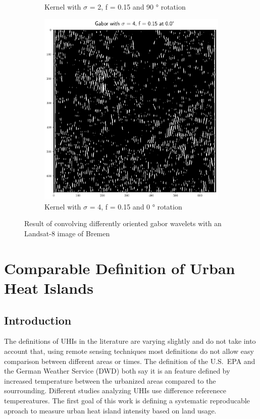 \documentclass[a4paper, english]{article}
\begin{document}
\begin{figure}[!htbp]
\begin{subfigure}[b]{0.3\textwidth}
         \caption{Kernel with $\sigma$ = 2, f = 0.15 and 90 ° rotation}\label{fig:feat05}
     \end{subfigure}
     \hfill
     \begin{subfigure}[b]{0.3\textwidth}
         \centering
         \includegraphics[width=\textwidth]{img/Features_4_015_0.png}
         \caption{Kernel with $\sigma$ = 4, f = 0.15 and 0 ° rotation}\label{fig:feat06}
     \end{subfigure}
        \caption{Result of convolving differently oriented gabor wavelets with an Landsat-8 image of Bremen}\label{fig:gaborExample}
    \end{figure}




    \section{Comparable Definition of Urban Heat Islands}\label{sec:definition}
    \subsection{Introduction}
    The definitions of \glspl{UHI} in the literature are varying slightly and do not take into account that, using remote sensing techniques most definitions do not allow easy comparison between different areas or times.
    The definition of the U.S.~EPA\cite{EPA2008} and the German Weather Service (DWD) both say it is an feature defined by increased temperature between the urbanized areas compared to the sourrounding. %
    Different studies analyzing \glspl{UHI} use difference referenece tempereatures.
    The first goal of this work is defining a systematic reproducable aproach to measure urban heat island intensity based on land usage.
\end{document}
